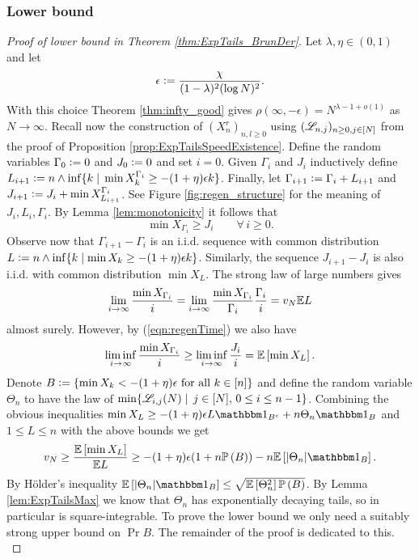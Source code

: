 \subsubsection{Lower bound}
\begin{proof}[Proof of lower bound in Theorem \ref{thm:ExpTails_BrunDer}]

Let $\lambda, \eta \in (0,1)$ and let 
\begin{equation}\nonumber
\epsilon \vcentcolon= \frac{\chi}{(1-\lambda)^2(\log N)^2}. 
\end{equation}
With this choice Theorem \ref{thm:infty_good} gives $\rho(\infty, - \epsilon) = N^{\lambda - 1 + o(1)}$ as $N \to \infty$. Recall now the construction of $(X^r_n)_{n, l \geq 0}$ using $(\mathscr{L}_{n, j})_{n \geq 0, j \in [N]}$ from the proof of Proposition \ref{prop:ExpTailsSpeedExistence}. Define the random variables $\Gamma_0 \vcentcolon= 0$ and $J_0 \vcentcolon= 0$ and set $i = 0$. Given $\Gamma_i$ and $J_i$ inductively define $L_{i+1} \vcentcolon= n \land \inf\{ k \mid\, \min X^{\Gamma_i}_k \geq -(1+\eta)\epsilon k\}$. Finally, let $\Gamma_{i+1} \vcentcolon= \Gamma_i + L_{i+1}$ and $J_{i+1} \vcentcolon= J_i + \min X^{\Gamma_i}_{L_{i+1}}$. See Figure \ref{fig:regen_structure} for the meaning of $J_i, L_i, \Gamma_i$. By Lemma \ref{lem:monotonicity} it follows that 
\begin{equation}\label{eqn:regenTime}
\min X_{\Gamma_i} \geq J_i \qquad\forall\, i \geq 0. 
\end{equation}
Observe now that $\Gamma_{i+1} - \Gamma_i$ is an i.i.d. sequence with common distribution $L \vcentcolon= n \land \inf \{ k \mid \min X_k \geq - (1+\eta)\epsilon k\}$. Similarly, the sequence $J_{i+1} - J_i$ is also i.i.d. with common distribution $\min X_L$. The strong law of large numbers gives 
\begin{equation}
\lim\limits_{i \to \infty} \frac{\min X_{\Gamma_i}}{i} = \lim\limits_{i \to \infty} \frac{\min X_{\Gamma_i}}{\Gamma_i} \frac{\Gamma_i}{i} = v_N \mathbb{E} L
\end{equation}
almost surely. However, by (\ref{eqn:regenTime}) we also have
\begin{equation}
\liminf\limits_{i \to \infty} \frac{\min X_{\Gamma_i}}{i} \geq \liminf\limits_{i \to \infty} \frac{J_i}{i} = \mathbb{E}\left[ \min X_L \right].
\end{equation}
Denote $B \vcentcolon= \{ \min X_k < - (1+\eta)\epsilon \text{ for all } k \in [n]\}$ and define the random variable $\Theta_n$ to have the law of $\min \{\mathscr{L}_{i, j}(N) \mid\, j \in [N],\, 0 \leq i \leq n - 1 \}$. Combining the obvious inequalities $\min X_L \geq -(1 + \eta)\epsilon L \Ind_{B^c} + n \Theta_n \Ind_B$ and $1 \leq L \leq n$ with the above bounds we get
\begin{equation}\label{eqn:lowerBdd}
v_N \geq \frac{\Ex{\min X_L}}{\E L} \geq -(1+\eta)\epsilon (1 + n\Pr{B}) - n\Ex{|\Theta_n| \Ind_B}. 
\end{equation}
By Hölder's inequality $\Ex{|\Theta_n| \Ind_B} \leq \sqrt{\Ex{\Theta_n^2}\Pr{B}}$. By Lemma \ref{lem:ExpTailsMax} we know that $\Theta_n$ has exponentially decaying tails, so in particular is square-integrable. To prove the lower bound we only need a suitably strong upper bound on $\Pr{B}$. The remainder of the proof is dedicated to this. \\


\end{proof}
